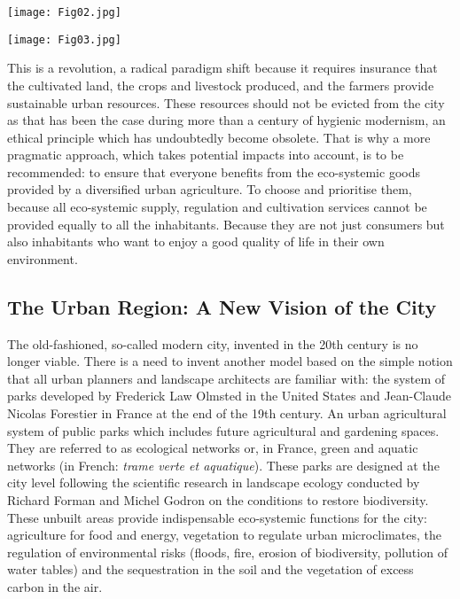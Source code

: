 \documentclass[10pt,a4paper]{article}
\begin{document}
\begin{multicols}{2}
\vspace{\baselineskip}

\noindent
\begin{minipage}{\columnwidth}
\centering
\resizebox{0.85\columnwidth}{!}
{\texttt{[image: Fig02.jpg]}}
\end{minipage}

\vspace{\baselineskip}

\noindent
\begin{minipage}{\columnwidth}
\centering
\resizebox{\columnwidth}{!}
{\texttt{[image: Fig03.jpg]}}
\end{minipage}

\clearpage

This is a revolution, a radical paradigm shift because it requires insurance that the cultivated land, the crops and livestock produced, and the farmers provide sustainable urban resources. These resources should not be evicted from the city as that has been the case during more than a century of hygienic modernism, an ethical principle which has undoubtedly become obsolete. That is why a more pragmatic approach, which  takes potential impacts into account, is to be recommended: to ensure that everyone benefits from the eco-systemic goods provided by a diversified urban agriculture. To choose and prioritise them, because all eco-systemic supply, regulation and cultivation services cannot be provided equally to all the inhabitants. Because they are not just consumers but also inhabitants who want to enjoy a good quality of life in their own environment.  

\subsection{The Urban Region: A New Vision of the City}
\noindent The old-fashioned, so-called modern city, invented in the 20th century is no longer viable. There is a need to invent another model based on the simple notion that all urban planners and landscape architects are familiar with: the system of parks developed by Frederick Law Olmsted in the United States and Jean-Claude Nicolas Forestier in France at the end of the 19th century. An urban agricultural system of public parks which includes future agricultural and gardening spaces. They are referred to as ecological networks or, in France, green and aquatic networks (in French: \textit{trame verte et aquatique}). These parks are designed at the city level following the scientific research in landscape ecology conducted by Richard Forman and Michel Godron on the conditions to restore biodiversity. These unbuilt areas provide indispensable eco-systemic functions for the city: agriculture for food and energy, vegetation to regulate urban microclimates, the regulation of environmental risks (floods, fire, erosion of biodiversity, pollution of water tables) and the sequestration in the soil and the vegetation of excess carbon in the air.


\end{multicols}
\end{document}
